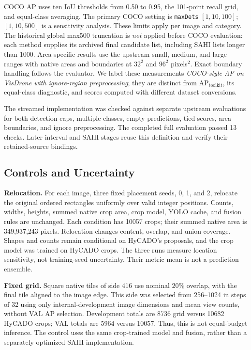 \documentclass[journal]{IEEEtran}
\newcommand{\APlit}{\mathrm{AP}_{\mathrm{toolkit}}}
\begin{document}
COCO AP uses ten IoU thresholds from 0.50 to 0.95, the 101-point recall grid, and equal-class averaging. The primary COCO setting is \texttt{maxDets} $[1,10,100]$; $[1,10,500]$ is a sensitivity analysis. These limits apply per image and category. The historical global max500 truncation is \emph{not} applied before COCO evaluation: each method supplies its archived final candidate list, including SAHI lists longer than 1000. Area-specific results use the upstream small, medium, and large ranges with native areas and boundaries at $32^2$ and $96^2$ pixels$^2$. Exact boundary handling follows the evaluator. We label these measurements \emph{COCO-style AP on VisDrone with ignore-region preprocessing}; they are distinct from $\APlit$, its equal-class diagnostic, and scores computed with different dataset conversions.

The streamed implementation was checked against separate upstream evaluations for both detection caps, multiple classes, empty predictions, tied scores, area boundaries, and ignore preprocessing. The completed full evaluation passed 13 checks. Later interval and SAHI stages reuse this definition and verify their retained-source bindings.

\subsection{Controls and Uncertainty}
\textbf{Relocation.} For each image, three fixed placement seeds, 0, 1, and 2, relocate the original ordered rectangles uniformly over valid integer positions. Counts, widths, heights, summed native crop area, crop model, YOLO cache, and fusion rules are unchanged. Each condition has 10057 crops; their summed native area is 349,937,243 pixels. Relocation changes content, overlap, and union coverage. Shapes and counts remain conditional on HyCADO's proposals, and the crop model was trained on HyCADO crops. The three runs measure location sensitivity, not training-seed uncertainty. Their metric mean is not a prediction ensemble.

\textbf{Fixed grid.} Square native tiles of side 416 use nominal 20\% overlap, with the final tile aligned to the image edge. This side was selected from 256--1024 in steps of 32 using only internal-development image dimensions and mean view counts, without VAL AP selection. Development totals are 8736 grid versus 10682 HyCADO crops; VAL totals are 5964 versus 10057. Thus, this is not equal-budget inference. The control uses the same crop-trained model and fusion, rather than a separately optimized SAHI implementation.
\end{document}
